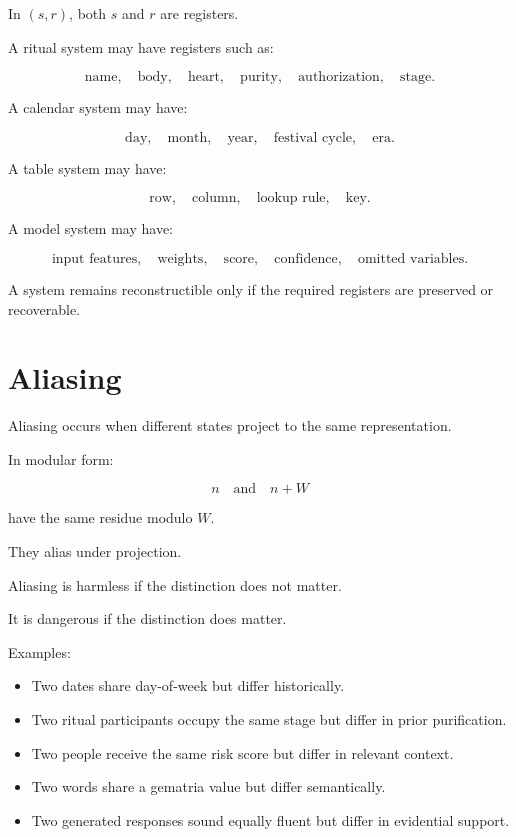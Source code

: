 \documentclass[11pt]{book}
\begin{document}
In \((s,r)\), both \(s\) and \(r\) are registers.

A ritual system may have registers such as:

\[
\text{name},
\quad
\text{body},
\quad
\text{heart},
\quad
\text{purity},
\quad
\text{authorization},
\quad
\text{stage}.
\]

A calendar system may have:

\[
\text{day},
\quad
\text{month},
\quad
\text{year},
\quad
\text{festival cycle},
\quad
\text{era}.
\]

A table system may have:

\[
\text{row},
\quad
\text{column},
\quad
\text{lookup rule},
\quad
\text{key}.
\]

A model system may have:

\[
\text{input features},
\quad
\text{weights},
\quad
\text{score},
\quad
\text{confidence},
\quad
\text{omitted variables}.
\]

A system remains reconstructible only if the required registers are preserved or recoverable.

\section{Aliasing}

Aliasing occurs when different states project to the same representation.

In modular form:

\[
n
\quad \text{and} \quad
n+W
\]

have the same residue modulo \(W\).

They alias under projection.

Aliasing is harmless if the distinction does not matter.

It is dangerous if the distinction does matter.

Examples:

\begin{itemize}
    \item Two dates share day-of-week but differ historically.
    \item Two ritual participants occupy the same stage but differ in prior purification.
    \item Two people receive the same risk score but differ in relevant context.
    \item Two words share a gematria value but differ semantically.
    \item Two generated responses sound equally fluent but differ in evidential support.
\end{itemize}
\end{document}
